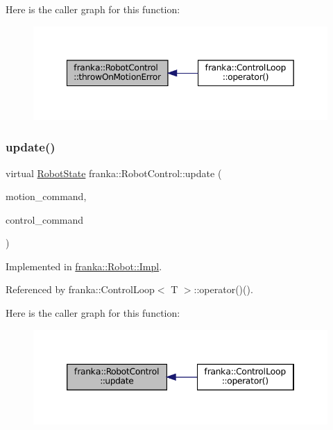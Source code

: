Here is the caller graph for this function\+:
\nopagebreak
\begin{figure}[H]
\begin{center}
\leavevmode
\includegraphics[width=349pt]{classfranka_1_1RobotControl_a796e9fb049ffc36ea44bec85f24e2fe4_icgraph}
\end{center}
\end{figure}
\mbox{\label{classfranka_1_1RobotControl_a5b581e84547a76ad1600158345cfd40d}} 
\subsubsection{\texorpdfstring{update()}{update()}}
{\footnotesize\ttfamily virtual \hyperlink{structfranka_1_1RobotState}{Robot\+State} franka\+::\+Robot\+Control\+::update (\begin{DoxyParamCaption}\item[{const \hyperlink{structresearch__interface_1_1robot_1_1MotionGeneratorCommand}{research\+\_\+interface\+::robot\+::\+Motion\+Generator\+Command} $\ast$}]{motion\+\_\+command,  }\item[{const \hyperlink{structresearch__interface_1_1robot_1_1ControllerCommand}{research\+\_\+interface\+::robot\+::\+Controller\+Command} $\ast$}]{control\+\_\+command }\end{DoxyParamCaption})\hspace{0.3cm}{\ttfamily [pure virtual]}}



Implemented in \hyperlink{classfranka_1_1Robot_1_1Impl_a961bcad42d2be61ff56b7004498fa8dd}{franka\+::\+Robot\+::\+Impl}.



Referenced by franka\+::\+Control\+Loop$<$ T $>$\+::operator()().

Here is the caller graph for this function\+:
\nopagebreak
\begin{figure}[H]
\begin{center}
\leavevmode
\includegraphics[width=346pt]{classfranka_1_1RobotControl_a5b581e84547a76ad1600158345cfd40d_icgraph}
\end{center}
\end{figure}


